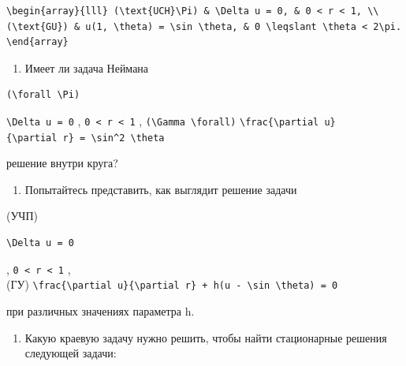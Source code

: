 \documentclass[
  ukrainian,
]{article}
\providecommand{\tightlist}{%
  \setlength{\itemsep}{0pt}\setlength{\parskip}{0pt}}
\begin{document}
\begin{verbatim}
\begin{array}{lll} (\text{UCH}\Pi) & \Delta u = 0, & 0 < r < 1, \\ (\text{GU}) & u(1, \theta) = \sin \theta, & 0 \leqslant \theta < 2\pi. \end{array}
\end{verbatim}

\begin{enumerate}
\def\labelenumi{\arabic{enumi}.}
\setcounter{enumi}{1}
\tightlist
\item
  Имеет ли задача Неймана
\end{enumerate}

\begin{verbatim}
(\forall \Pi)
\end{verbatim}

\texttt{\textbackslash{}Delta\ u\ =\ 0} ,
\texttt{0\ \textless{}\ r\ \textless{}\ 1} ,
\texttt{(\textbackslash{}Gamma\ \textbackslash{}forall)}
\texttt{\textbackslash{}frac\{\textbackslash{}partial\ u\}\{\textbackslash{}partial\ r\}\ =\ \textbackslash{}sin\^{}2\ \textbackslash{}theta}

решение внутри круга?

\begin{enumerate}
\def\labelenumi{\arabic{enumi}.}
\setcounter{enumi}{2}
\tightlist
\item
  Попытайтесь представить, как выглядит решение задачи
\end{enumerate}

(УЧП)

\begin{verbatim}
\Delta u = 0
\end{verbatim}

, \texttt{0\ \textless{}\ r\ \textless{}\ 1} ,\\
(ГУ)
\texttt{\textbackslash{}frac\{\textbackslash{}partial\ u\}\{\textbackslash{}partial\ r\}\ +\ h(u\ -\ \textbackslash{}sin\ \textbackslash{}theta)\ =\ 0}

при различных значениях параметра h.

\begin{enumerate}
\def\labelenumi{\arabic{enumi}.}
\setcounter{enumi}{3}
\tightlist
\item
  Какую краевую задачу нужно решить, чтобы найти стационарные решения
  следующей задачи:
\end{enumerate}
\end{document}
